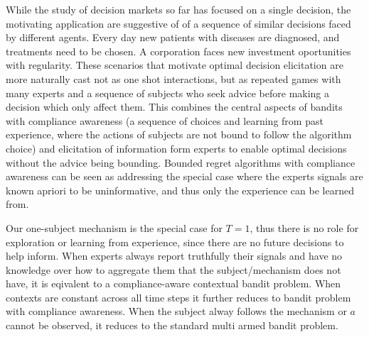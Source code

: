 



While the study of decision markets so far has focused on a single decision, the motivating application are suggestive of of a sequence of similar decisions faced by different agents.
Every day new patients with diseases are diagnosed, and treatments need to be chosen. 
A corporation faces new investment oportunities with regularity.
These scenarios that motivate optimal decision elicitation are more naturally cast not as one shot interactions, but as repeated games with many experts and a sequence of subjects who seek advice before making a decision which only affect them.
This combines the central aspects of bandits with compliance awareness (a sequence of choices and learning from past experience, where the actions of subjects are not bound to follow the algorithm choice) and elicitation of information form experts to enable optimal decisions without the advice being bounding. 
Bounded regret algorithms with compliance awareness can be seen as addressing the special case where the experts signals are known apriori to be uninformative, and thus only the experience can be learned from.

Our one-subject mechanism is the special case for $T={1}$, thus there is no role for exploration or learning from experience, since there are no future decisions  to help inform.
When experts always report truthfully their signals and  have no knowledge over how to aggregate them that the subject/mechanism does not have,  it is eqivalent to a compliance-aware contextual bandit problem. 
When contexts are constant across all time steps it further reduces to bandit problem with compliance awareness.
When the subject alway follows the mechanism or $a$ cannot be observed, it reduces to the standard multi armed bandit problem. 

